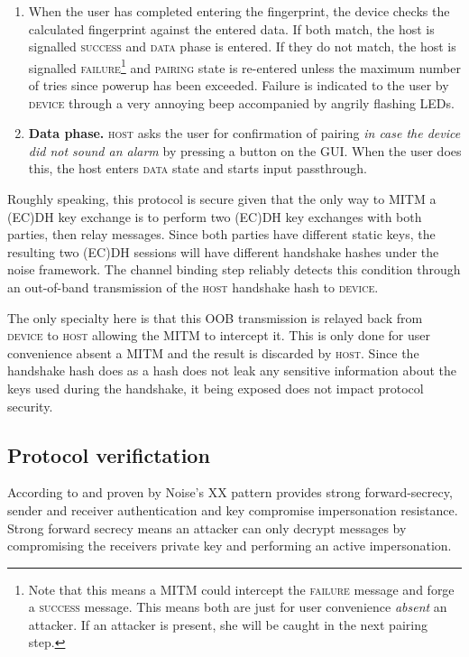 \documentclass[12pt,a4paper,notitlepage]{article}
\begin{document}
\begin{enumerate}
{        types.
    }.
\item When the user has completed entering the fingerprint, the device checks the calculated fingerprint against the
    entered data. If both match, the host is signalled \textsc{success} and \textsc{data} phase is entered. If they do
    not match, the host is signalled \textsc{failure}\footnote{
        Note that this means a MITM could intercept the \textsc{failure} message and forge a \textsc{success} message.
        This means both are just for user convenience \emph{absent} an attacker. If an attacker is present, she will be
        caught in the next pairing step.
    } and \textsc{pairing} state is re-entered unless the maximum number of tries since powerup has been exceeded.
    Failure is indicated to the user by \textsc{device} through a very annoying beep accompanied by angrily flashing
    LEDs.
\item \textbf{Data phase.} \textsc{host} asks the user for confirmation of pairing \emph{in case the device did not sound an alarm} by
    pressing a button on the GUI. When the user does this, the host enters \textsc{data} state and starts input
    passthrough.
\end{enumerate}

Roughly speaking, this protocol is secure given that the only way to MITM a (EC)DH key exchange is to perform two (EC)DH
key exchanges with both parties, then relay messages. Since both parties have different static keys, the resulting two
(EC)DH sessions will have different handshake hashes under the noise framework. The channel binding step reliably
detects this condition through an out-of-band transmission of the \textsc{host} handshake hash to \textsc{device}.

The only specialty here is that this OOB transmission is relayed back from \textsc{device} to \textsc{host} allowing the
MITM to intercept it. This is only done for user convenience absent a MITM and the result is discarded by \textsc{host}.
Since the handshake hash does as a hash does not leak any sensitive information about the keys used during the
handshake, it being exposed does not impact protocol security.

\subsection{Protocol verifictation}
According to \textcite{perrin01} and proven by \textcite{kobeissi01} Noise's XX pattern provides strong forward-secrecy,
sender and receiver authentication and key compromise impersonation resistance. Strong forward secrecy means an attacker
can only decrypt messages by compromising the receivers private key and performing an active impersonation.
\end{document}
